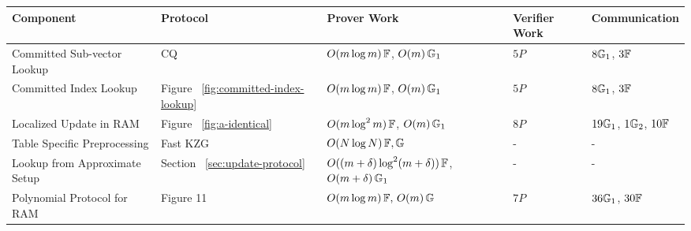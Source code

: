 \begin{table}[bt]
    \begin{tabular}{l|l|l|l|l}
        \hline
        {\bf Component  }                                                                                      & {\bf Protocol} & {\bf Prover Work}      & {\bf Verifier Work} & {\bf Communication}   \\ \hline
        Committed Sub-vector Lookup                                                                     & CQ ~\cite{EPRINT:EagFioGab22}      & $O(m \log m)\,\mathbb{F}$, $O(m)\,\mathbb{G}_1$      & $5P$            & $8\mathbb{G}_1$, $3\mathbb{F}$         \\ \hline
        Committed Index Lookup                                                                          & Figure ~\ref{fig:committed-index-lookup}    & $O(m \log m)\,\mathbb{F}$, $O(m)\,\mathbb{G}_1$      & $5P$            & $8\mathbb{G}_1$, $3\mathbb{F}$         \\ \hline
        Localized Update in RAM                                                                                & Figure ~\ref{fig:a-identical}   & $O(m \log^2 m)\, \mathbb{F}$, $O(m)\,\mathbb{G}_1$      & $8P$            & $19\mathbb{G}_1$, $1\mathbb{G}_2$, $10\mathbb{F}$ \\ \hline
        Table Specific Preprocessing                                                                    & Fast KZG ~\cite{EPRINT:FeiKho23}      & $O(N \log N)\,\mathbb{F},\mathbb{G}$      & -             & -               \\ \hline
        Lookup from Approximate Setup                                                                   & Section ~\ref{sec:update-protocol}    & $O((m+\delta)\log^2(m+\delta))\,\mathbb{F}$, $O(m+\delta)\,\mathbb{G}_1$ & -             & -               \\ \hline
        Polynomial Protocol for RAM                                                                     & Figure 11~\cite{full-ver}   & $O(m \log m)\,\mathbb{F},\, O(m)\,\mathbb{G}$      & $7P$            & $36\mathbb{G}_1$, $30\mathbb{F}$       \\ \hline

\end{tabular}
\end{table}
